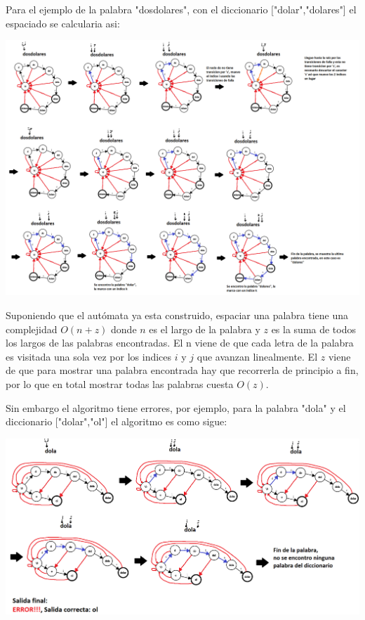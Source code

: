 \documentclass{article}
\begin{document}
Para el ejemplo de la palabra "dosdolares", con el diccionario ["dolar","dolares"] el espaciado se calcularia asi:

\begin{center}
\includegraphics[scale=0.3]{Imagenes/automata_falla_ejemplo_dosdolares.png}
\end{center}

Suponiendo que el autómata ya esta construido, espaciar una palabra tiene una complejidad $O(n+z)$ donde $n$ es el largo de la palabra y $z$ es la suma de todos los largos de las palabras encontradas.
El n viene de que cada letra de la palabra es visitada una sola vez por los indices $i$ y $j$ que avanzan linealmente. El $z$ viene de que para mostrar una palabra encontrada hay que recorrerla de principio
a fin, por lo que en total mostrar todas las palabras cuesta $O(z)$.

\newpage

Sin embargo el algoritmo tiene errores, por ejemplo, para la palabra "dola" y el diccionario ["dolar","ol"] el algoritmo es como sigue:

\begin{center}
    \includegraphics[scale=0.3]{Imagenes/automata_falla_ejemplo_dola.png}
\end{center}
\end{document}
